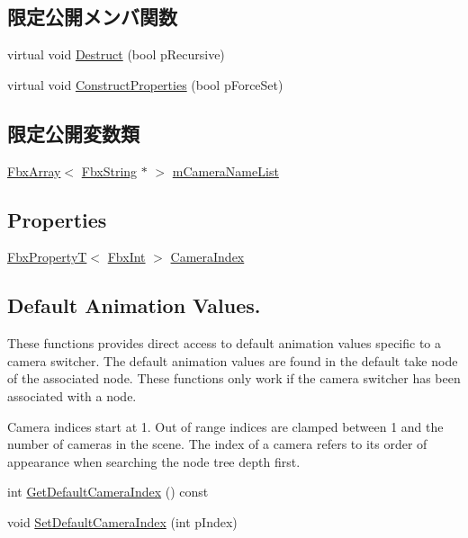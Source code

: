 \subsection*{限定公開メンバ関数}
\begin{DoxyCompactItemize}
\item 
virtual void \hyperlink{class_fbx_camera_switcher_aba10821ff1b60cb32a21da2fc55ea711}{Destruct} (bool p\+Recursive)
\item 
virtual void \hyperlink{class_fbx_camera_switcher_a38011053f3a61df4e93989d7c970fa16}{Construct\+Properties} (bool p\+Force\+Set)
\end{DoxyCompactItemize}
\subsection*{限定公開変数類}
\begin{DoxyCompactItemize}
\item 
\hyperlink{class_fbx_array}{Fbx\+Array}$<$ \hyperlink{class_fbx_string}{Fbx\+String} $\ast$ $>$ \hyperlink{class_fbx_camera_switcher_a03c2a77943c839af5cec42d8566724a9}{m\+Camera\+Name\+List}
\end{DoxyCompactItemize}
\subsection*{Properties}
\begin{DoxyCompactItemize}
\item 
\hyperlink{class_fbx_property_t}{Fbx\+PropertyT}$<$ \hyperlink{fbxtypes_8h_a088fa96de3b0b3ea69f0f6afef525dfb}{Fbx\+Int} $>$ \hyperlink{class_fbx_camera_switcher_a9128f6b644b222070f2e34e69874a41d}{Camera\+Index}
\end{DoxyCompactItemize}
\subsection*{Default Animation Values.}
\label{_amgrpf376b4419eaa217aa41352419bb6aa6e}%
These functions provides direct access to default animation values specific to a camera switcher. The default animation values are found in the default take node of the associated node. These functions only work if the camera switcher has been associated with a node.

Camera indices start at 1. Out of range indices are clamped between 1 and the number of cameras in the scene. The index of a camera refers to its order of appearance when searching the node tree depth first. \begin{DoxyCompactItemize}
\item 
int \hyperlink{class_fbx_camera_switcher_a283e9644112eee776c029b59ea02f857}{Get\+Default\+Camera\+Index} () const
\item 
void \hyperlink{class_fbx_camera_switcher_a23c4972acf381134aee70436e7d18549}{Set\+Default\+Camera\+Index} (int p\+Index)
\end{DoxyCompactItemize}
